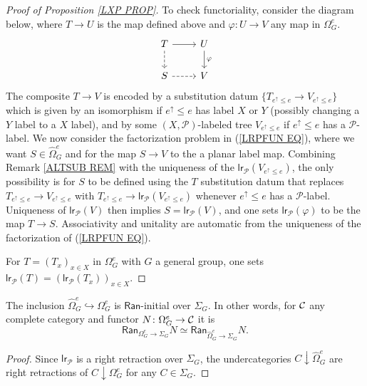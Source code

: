 \documentclass[a4paper,10pt]{article}%
\begin{document}
\begin{proof}[Proof of Proposition \ref{LXP PROP}]
To check functoriality,
consider the diagram below, where $T \to U$ is the map defined above and $\varphi \colon U \to V$ any map in $\Omega_G^e$.
\begin{equation}\label{LRPFUN EQ}
\begin{tikzcd}
	T \ar{r} \ar[dashed]{d} &  U \ar{d}{\varphi}
\\
	S \ar[dashed]{r} & V
\end{tikzcd}
\end{equation}
The composite $T \to V$ is encoded by a substitution datum
$\{T_{e^{\uparrow} \leq e} \to V_{e^{\uparrow} \leq e}\}$
which is given by an isomorphism
if $e^{\uparrow} \leq e$ has label $X$ or $Y$ (possibly changing a $Y$ label to a $X$ label),
and by some $(X,\mathcal{P})$-labeled tree 
$V_{e^{\uparrow} \leq e}$ if $e^{\uparrow} \leq e$
has a $\mathcal{P}$-label.
We now consider the factorization problem 
in (\ref{LRPFUN EQ}), where we want $S \in \widehat{\Omega}_G^e$
and for the map $S \to V$ to the a planar label map.
Combining Remark \ref{ALTSUB REM} with the uniqueness of the
$\mathsf{lr}_{\mathcal{P}}(V_{e^{\uparrow} \leq e})$,
the only possibility is for $S$ to be defined using the 
$T$ substitution datum
that replaces 
$T_{e^{\uparrow} \leq e} \to V_{e^{\uparrow} \leq e}$
with 
$T_{e^{\uparrow} \leq e} \to 
\mathsf{lr}_{\mathcal{P}}(V_{e^{\uparrow} \leq e})$
whenever $e^{\uparrow} \leq e$ has a $\mathcal{P}$-label.
Uniqueness of $\mathsf{lr}_{\mathcal{P}} (V)$ then implies 
$S=\mathsf{lr}_{\mathcal{P}} (V)$, and one sets 
$\mathsf{lr}_{\mathcal{P}} (\varphi)$
to be the map $T\to S$.
Associativity and unitality are automatic from the uniqueness of the factorization of (\ref{LRPFUN EQ}).

For $T = (T_x)_{x \in X}$ in 
$\Omega_G^e$ with $G$ a general group,
one sets
$\mathsf{lr}_{\mathcal{P}}(T) = (\mathsf{lr}_{\mathcal{P}}(T_x))_{x \in X}$.
\end{proof}



\begin{corollary}\label{KANRED COR}
The inclusion 
$\widehat{\Omega}_G^e \hookrightarrow \Omega_G^e$ 
is $\mathsf{Ran}$-initial over $\Sigma_G$.
In other words, for $\mathcal{C}$ any complete category and 
functor $N \colon \Omega_G^e \to \mathcal{C}$ it is
\[
\mathsf{Ran}_{\Omega_G^e \to \Sigma_G} N
	\simeq 
\mathsf{Ran}_{\widehat{\Omega}_G^e \to \Sigma_G} N.
\]
\end{corollary}

\begin{proof}
	Since $\mathsf{lr}_{\mathcal{P}}$ is a right retraction over $\Sigma_G$, the undercategories 
	$C \downarrow \widehat{\Omega}_G^e$ are right retractions of 
	$C \downarrow \Omega_G^e$ for any $C \in \Sigma_G$.
\end{proof}
\end{document}
